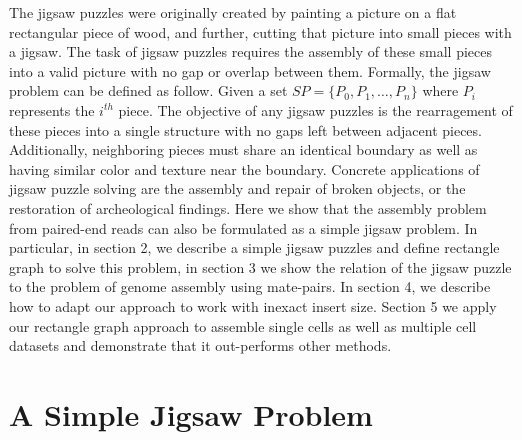 \documentclass[a4paper]{article}
\begin{document}
The jigsaw puzzles were originally created by painting a picture on a flat rectangular piece of wood, 
and further, cutting that picture into
small pieces with a jigsaw. The task of jigsaw puzzles requires the assembly of these small pieces into a valid picture with no gap or overlap between
them. Formally, the jigsaw problem can be defined as follow. Given a set $SP = \{ P_0, P_1,\ldots, P_n\}$ where $P_i$ represents the $i^{th}$ piece.
The objective of any jigsaw puzzles is the rearragement of these pieces into a single structure with no gaps left between adjacent pieces. Additionally,
neighboring pieces must share an identical boundary as well as having similar color and 
texture near the boundary.
Concrete applications of jigsaw puzzle solving are the assembly and repair of broken objects, 
or the restoration of archeological findings. Here we show
that the assembly problem from paired-end reads can also be formulated as a simple jigsaw problem. %
In particular, in section 2, we describe a simple jigsaw puzzles and define rectangle graph to solve this 
problem, in section 3 we show the relation of the jigsaw puzzle to the 
problem of genome assembly using mate-pairs. In section 4, we describe how to adapt our approach 
to work with inexact insert size. Section 5 we apply our rectangle graph approach to 
assemble single cells as well as multiple cell datasets and demonstrate that it out-performs
other methods.

\section{A Simple Jigsaw Problem}
\end{document}
